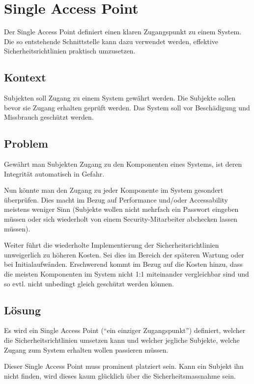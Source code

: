 \section{Single Access Point}
\label{sec:singleaccesspoint}

Der Single Access Point definiert einen klaren Zugangspunkt zu einem System. Die so entstehende Schnittstelle kann dazu verwendet werden, effektive Sicherheitsrichtlinien praktisch umzusetzen.

\subsection*{Kontext}
Subjekten soll Zugang zu einem System gewährt werden. Die Subjekte sollen bevor sie Zugang erhalten geprüft werden. Das System soll vor Beschädigung und Missbrauch geschützt werden.

\subsection*{Problem}
Gewährt man Subjekten Zugang zu den Komponenten eines Systems, ist deren Integrität automatisch in Gefahr.

Nun könnte man den Zugang zu jeder Komponente im System gesondert überprüfen. Dies macht im Bezug auf Performance und/oder Accessability meistens weniger Sinn (Subjekte wollen nicht mehrfach ein Passwort eingeben müssen oder sich wiederholt von einem Security-Mitarbeiter abchecken lassen müssen).

Weiter führt die wiederholte Implementierung der Sicherheitsrichtlinien unweigerlich zu höheren Kosten. Sei dies im Bereich der späteren Wartung oder bei Initialaufwänden. Erschwerend kommt im Bezug auf die Kosten hinzu, dass die meisten Komponenten im System nicht 1:1 miteinander vergleichbar sind und so evtl. nicht unbedingt gleich geschützt werden können.


\subsection*{Lösung}
Es wird ein Single Access Point (``ein einziger Zugangspunkt'') definiert, welcher die Sicherheitsrichtlinien umsetzen kann und welcher jegliche Subjekte, welche Zugang zum System erhalten wollen passieren müssen.

Dieser Single Access Point muss prominent platziert sein. Kann ein Subjekt ihn nicht finden, wird dieses kaum glücklich über die Sicherheitsmassnahme sein. 


